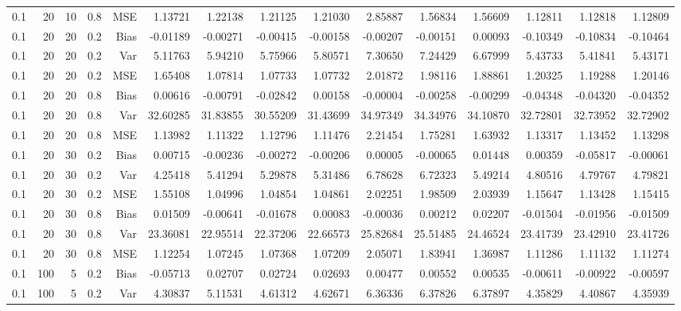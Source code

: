 \begin{table}[!htbp]
\begin{tabular}{lrrrrrrrrrrrrrr}
0.1 &  20 & 10 & 0.8 & MSE & 1.13721 & 1.22138 & 1.21125 & 1.21030 & 2.85887 & 1.56834 & 1.56609 & 1.12811 & 1.12818 & 1.12809 \\
0.1 &  20 & 20 & 0.2 & Bias & -0.01189 & -0.00271 & -0.00415 & -0.00158 & -0.00207 & -0.00151 & 0.00093 & -0.10349 & -0.10834 & -0.10464 \\
0.1 &  20 & 20 & 0.2 & Var & 5.11763 & 5.94210 & 5.75966 & 5.80571 & 7.30650 & 7.24429 & 6.67999 & 5.43733 & 5.41841 & 5.43171 \\
0.1 &  20 & 20 & 0.2 & MSE & 1.65408 & 1.07814 & 1.07733 & 1.07732 & 2.01872 & 1.98116 & 1.88861 & 1.20325 & 1.19288 & 1.20146 \\
0.1 &  20 & 20 & 0.8 & Bias & 0.00616 & -0.00791 & -0.02842 & 0.00158 & -0.00004 & -0.00258 & -0.00299 & -0.04348 & -0.04320 & -0.04352 \\
0.1 &  20 & 20 & 0.8 & Var & 32.60285 & 31.83855 & 30.55209 & 31.43699 & 34.97349 & 34.34976 & 34.10870 & 32.72801 & 32.73952 & 32.72902 \\
0.1 &  20 & 20 & 0.8 & MSE & 1.13982 & 1.11322 & 1.12796 & 1.11476 & 2.21454 & 1.75281 & 1.63932 & 1.13317 & 1.13452 & 1.13298 \\
0.1 &  20 & 30 & 0.2 & Bias & 0.00715 & -0.00236 & -0.00272 & -0.00206 & 0.00005 & -0.00065 & 0.01448 & 0.00359 & -0.05817 & -0.00061 \\
0.1 &  20 & 30 & 0.2 & Var & 4.25418 & 5.41294 & 5.29878 & 5.31486 & 6.78628 & 6.72323 & 5.49214 & 4.80516 & 4.79767 & 4.79821 \\
0.1 &  20 & 30 & 0.2 & MSE & 1.55108 & 1.04996 & 1.04854 & 1.04861 & 2.02251 & 1.98509 & 2.03939 & 1.15647 & 1.13428 & 1.15415 \\
0.1 &  20 & 30 & 0.8 & Bias & 0.01509 & -0.00641 & -0.01678 & 0.00083 & -0.00036 & 0.00212 & 0.02207 & -0.01504 & -0.01956 & -0.01509 \\
0.1 &  20 & 30 & 0.8 & Var & 23.36081 & 22.95514 & 22.37206 & 22.66573 & 25.82684 & 25.51485 & 24.46524 & 23.41739 & 23.42910 & 23.41726 \\
0.1 &  20 & 30 & 0.8 & MSE & 1.12254 & 1.07245 & 1.07368 & 1.07209 & 2.05071 & 1.83941 & 1.36987 & 1.11286 & 1.11132 & 1.11274 \\
0.1 & 100 &  5 & 0.2 & Bias & -0.05713 & 0.02707 & 0.02724 & 0.02693 & 0.00477 & 0.00552 & 0.00535 & -0.00611 & -0.00922 & -0.00597 \\
0.1 & 100 &  5 & 0.2 & Var & 4.30837 & 5.11531 & 4.61312 & 4.62671 & 6.36336 & 6.37826 & 6.37897 & 4.35829 & 4.40867 & 4.35939 \\

\end{tabular}
\end{table}
